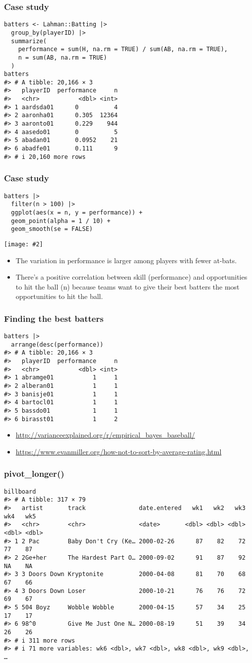 \documentclass{beamer}
\newcommand{\bi}{\begin{itemize}}
\newcommand{\li}{\item}
\newcommand{\ei}{\end{itemize}}
\newcommand{\fig}[2]{\centerline{\texttt{[image: \#2]}}}
\newcommand{\bfr}[1]{\begin{frame}[fragile]\frametitle{{ #1 }}}
\begin{document}
\bfr{Case study}\scriptsize
\begin{verbatim}
batters <- Lahman::Batting |> 
  group_by(playerID) |> 
  summarize(
    performance = sum(H, na.rm = TRUE) / sum(AB, na.rm = TRUE),
    n = sum(AB, na.rm = TRUE)
  )
batters
#> # A tibble: 20,166 × 3
#>   playerID  performance     n
#>   <chr>           <dbl> <int>
#> 1 aardsda01      0          4
#> 2 aaronha01      0.305  12364
#> 3 aaronto01      0.229    944
#> 4 aasedo01       0          5
#> 5 abadan01       0.0952    21
#> 6 abadfe01       0.111      9
#> # i 20,160 more rows
\end{verbatim}
\end{frame}


\bfr{Case study}\scriptsize
\begin{verbatim}
batters |> 
  filter(n > 100) |> 
  ggplot(aes(x = n, y = performance)) +
  geom_point(alpha = 1 / 10) + 
  geom_smooth(se = FALSE)
\end{verbatim}
\fig{0.6}{unnamed-chunk-58-1.png}
\bi
\li The variation in performance is larger among players with fewer at-bats.
\li
There’s a positive correlation between skill (performance) and opportunities to hit the ball (n) because teams want to give their best batters the most opportunities to hit the ball.
\ei
\end{frame}

\bfr{Finding the best batters}
{\scriptsize
\begin{verbatim}
batters |> 
  arrange(desc(performance))
#> # A tibble: 20,166 × 3
#>   playerID  performance     n
#>   <chr>           <dbl> <int>
#> 1 abramge01           1     1
#> 2 alberan01           1     1
#> 3 banisje01           1     1
#> 4 bartocl01           1     1
#> 5 bassdo01            1     1
#> 6 birasst01           1     2
\end{verbatim}
}
\bi
\li \url{http://varianceexplained.org/r/empirical_bayes_baseball/}
\li \url{https://www.evanmiller.org/how-not-to-sort-by-average-rating.html}
\ei
\end{frame}

\bfr{pivot\_longer()}\scriptsize
\begin{verbatim}
billboard
#> # A tibble: 317 × 79
#>   artist       track               date.entered   wk1   wk2   wk3   wk4   wk5
#>   <chr>        <chr>               <date>       <dbl> <dbl> <dbl> <dbl> <dbl>
#> 1 2 Pac        Baby Don't Cry (Ke… 2000-02-26      87    82    72    77    87
#> 2 2Ge+her      The Hardest Part O… 2000-09-02      91    87    92    NA    NA
#> 3 3 Doors Down Kryptonite          2000-04-08      81    70    68    67    66
#> 4 3 Doors Down Loser               2000-10-21      76    76    72    69    67
#> 5 504 Boyz     Wobble Wobble       2000-04-15      57    34    25    17    17
#> 6 98^0         Give Me Just One N… 2000-08-19      51    39    34    26    26
#> # i 311 more rows
#> # i 71 more variables: wk6 <dbl>, wk7 <dbl>, wk8 <dbl>, wk9 <dbl>, …
\end{verbatim}
\end{frame}
\end{document}
